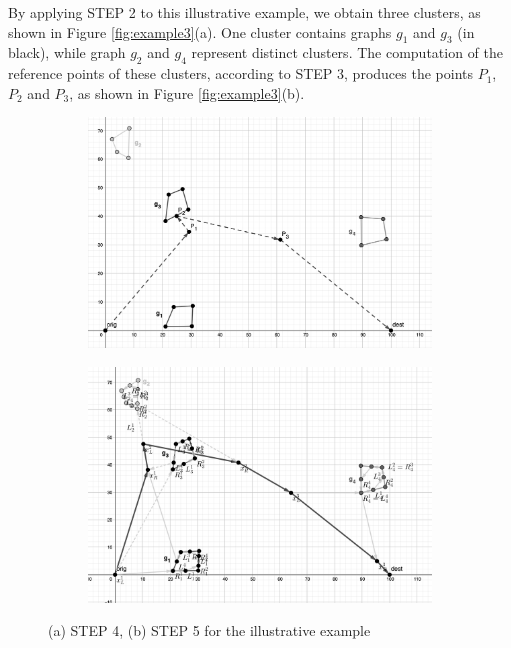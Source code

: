\documentclass[10pt,a4paper]{elsarticle}
\begin{document}
\noindent
By applying STEP 2 to this illustrative example, we obtain three clusters, as shown in Figure \ref{fig:example3}(a). One cluster contains graphs $g_1$ and $g_3$ (in black), while graph $g_2$ and $g_4$ represent distinct clusters. The computation of the reference points of these clusters, according to STEP 3, produces the points $P_1$, $P_2$ and  $P_3$, as shown in Figure  \ref{fig:example3}(b).


\begin{figure}[h!]
	\centering
	\begin{subfigure}[b]{0.4\textwidth}
		\includegraphics[width=\textwidth]{example_step4_new_gray.png}
		\caption{}%
	\end{subfigure}
	\begin{subfigure}[b]{0.4\textwidth}
		\includegraphics[width=\textwidth]{example_step5_new_gray.png}
		\caption{}
	\end{subfigure}%
	\caption{(a) STEP 4, (b) STEP 5 for the illustrative example}%
	\label{fig:example4}%
\end{figure}
\end{document}
